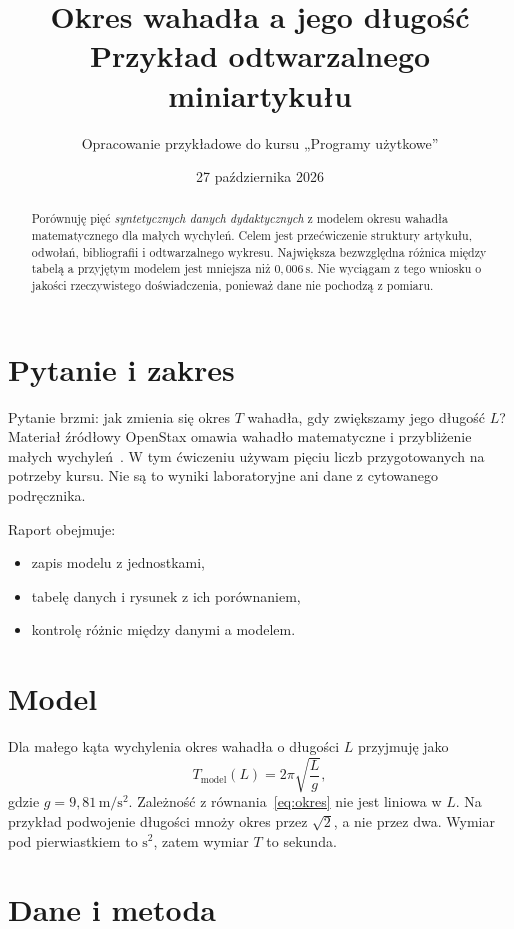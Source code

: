 \documentclass[a4paper,11pt]{article}
\title{Okres wahadła a jego długość\\\large Przykład odtwarzalnego miniartykułu}
\author{Opracowanie przykładowe do kursu „Programy użytkowe”}
\date{27 października 2026}
\begin{document}
\maketitle

\begin{abstract}
Porównuję pięć \emph{syntetycznych danych dydaktycznych} z modelem okresu
wahadła matematycznego dla małych wychyleń. Celem jest przećwiczenie
struktury artykułu, odwołań, bibliografii i odtwarzalnego wykresu.
Największa bezwzględna różnica między tabelą a przyjętym modelem jest
mniejsza niż $0{,}006\,\mathrm{s}$. Nie wyciągam z tego wniosku o jakości
rzeczywistego doświadczenia, ponieważ dane nie pochodzą z pomiaru.
\end{abstract}

\section{Pytanie i zakres}\label{sec:pytanie}
Pytanie brzmi: jak zmienia się okres $T$ wahadła, gdy zwiększamy jego
długość $L$? Materiał źródłowy OpenStax omawia wahadło matematyczne i
przybliżenie małych wychyleń~\cite{openstax_pendulum}. W tym ćwiczeniu
używam pięciu liczb przygotowanych na potrzeby kursu. Nie są to wyniki
laboratoryjne ani dane z cytowanego podręcznika.

Raport obejmuje:
\begin{itemize}
  \item zapis modelu z jednostkami,
  \item tabelę danych i rysunek z ich porównaniem,
  \item kontrolę różnic między danymi a modelem.
\end{itemize}

\section{Model}\label{sec:model}
Dla małego kąta wychylenia okres wahadła o długości $L$ przyjmuję jako
\begin{equation}
  T_{\mathrm{model}}(L)=2\pi\sqrt{\frac{L}{g}},
  \label{eq:okres}
\end{equation}
gdzie $g=9{,}81\,\mathrm{m/s^2}$. Zależność z
równania~\eqref{eq:okres} nie jest liniowa w $L$. Na przykład podwojenie
długości mnoży okres przez $\sqrt{2}$, a nie przez dwa. Wymiar pod
pierwiastkiem to $\mathrm{s^2}$, zatem wymiar $T$ to sekunda.

\section{Dane i metoda}\label{sec:metoda}
\end{document}
